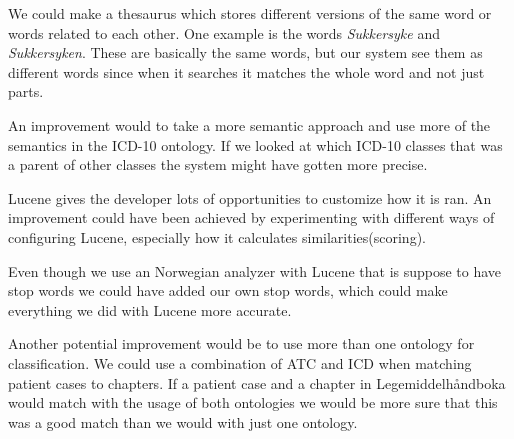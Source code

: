 We could make a thesaurus which stores different versions of the same word or
words related to each other. One example is the words \emph{Sukkersyke} and
\emph{Sukkersyken}. These are basically the same words, but our system see them
as different words since when it searches it matches the whole word and not just
parts.

An improvement would to take a more semantic approach and use more of the
semantics in the ICD-10 ontology. If we looked at which ICD-10 classes that was
a parent of other classes the system might have gotten more precise.

Lucene gives the developer lots of opportunities to customize how it is ran. An
improvement could have been achieved by experimenting with different ways of
configuring Lucene, especially how it calculates similarities(scoring).

Even though we use an Norwegian analyzer with Lucene that is suppose to have
stop words we could have added our own stop words, which could make everything
we did with Lucene more accurate.

Another potential improvement would be to use more than one ontology for
classification. We could use a combination of ATC and ICD when matching patient
cases to chapters. If a patient case and a chapter in Legemiddelhåndboka would
match with the usage of both ontologies we would be more sure that this was a
good match than we would with just one ontology.


